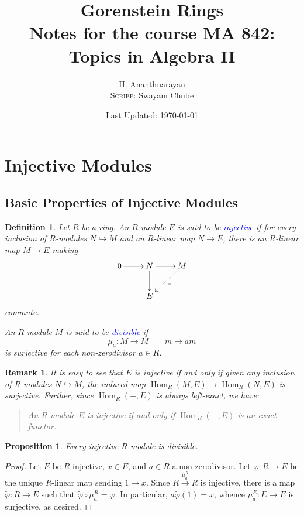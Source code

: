 \documentclass[10pt]{article}
\title{Gorenstein Rings\\\small{Notes for the course MA 842: Topics in Algebra II}}
\author{H. Ananthnarayan\\\small\textsc{Scribe:} Swayam Chube}
\date{Last Updated: \today}
\theoremstyle{thmstyle}
\newtheorem{proposition}[theorem]{Proposition}
\theoremstyle{defstyle}
\newtheorem{definition}[theorem]{Definition}
\newtheorem{remark}[theorem]{Remark}
\newcommand{\Hom}{\operatorname{Hom}}
\newcommand{\wt}[1]{\widetilde{#1}}
\newcommand{\into}{\hookrightarrow}
\newcommand{\define}[1]{\textcolor{blue}{\textit{#1}}}
\begin{document}
\maketitle
\tableofcontents

\section{Injective Modules}

\subsection{Basic Properties of Injective Modules}

\begin{definition}
    Let $R$ be a ring. An $R$-module $E$ is said to be \define{injective} if for every inclusion of $R$-modules $N\into M$ and an $R$-linear map $N\to E$, there is an $R$-linear map $M\to E$ making
    \begin{equation*}
        \xymatrix {
            0\ar[r] & N\ar[r]\ar[d] & M\ar@{.>}[ld]^{\exists}\\
            & E & 
        }
    \end{equation*}
    commute.

    An $R$-module $M$ is said to be \define{divisible} if 
    \begin{equation*}
        \mu_a: M\longrightarrow M\qquad m\longmapsto am
    \end{equation*}
    is surjective for each non-zerodivisor $a\in R$.
\end{definition}

\begin{remark}
    It is easy to see that $E$ is injective if and only if given any inclusion of $R$-modules $N\into M$, the induced map $\Hom_R(M, E)\to\Hom_R(N, E)$ is surjective. Further, since $\Hom_R(-, E)$ is always left-exact, we have: 
    \begin{quotation}
        An $R$-module $E$ is injective if and only if $\Hom_R(-, E)$ is an exact functor.
    \end{quotation}
\end{remark}

\begin{proposition}
    Every injective $R$-module is divisible. 
\end{proposition}
\begin{proof}
    Let $E$ be $R$-injective, $x\in E$, and $a\in R$ a non-zerodivisor. Let $\varphi: R\to E$ be the unique $R$-linear map sending $1\mapsto x$. Since $R\xrightarrow{\mu_a^R} R$ is injective, there is a map $\wt\varphi: R\to E$ such that $\wt\varphi\circ\mu_a^R = \varphi$. In particular, $a\wt\varphi(1) = x$, whence $\mu_a^E: E\to E$ is surjective, as desired.
\end{proof}
\end{document}
